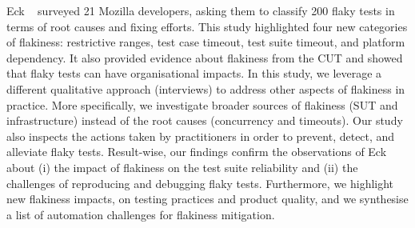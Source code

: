 Eck \etal~\cite{eck_understanding_2019} surveyed 21 Mozilla developers, asking them to classify 200 flaky tests in terms of root causes and fixing efforts. 
This study highlighted four new categories of flakiness: restrictive ranges, test case timeout, test suite timeout, and platform dependency.
It also provided evidence about flakiness from the CUT and showed that flaky tests can have organisational impacts.
In this study, we leverage a different qualitative approach (interviews) to address other aspects of flakiness in practice.
More specifically, we investigate broader sources of flakiness (\eg SUT and infrastructure) instead of the root causes (\eg concurrency and timeouts).
Our study also inspects the actions taken by practitioners in order to prevent, detect, and alleviate flaky tests.
Result-wise, our findings confirm the observations of Eck \etal about (i) the impact of flakiness on the test suite reliability and (ii) the challenges of reproducing and debugging flaky tests.
Furthermore, we highlight new flakiness impacts, on testing practices and product quality, and we synthesise a list of automation challenges for flakiness mitigation.



